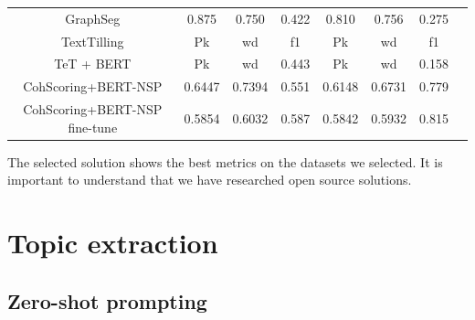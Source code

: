 \documentclass[PMI,VKR]{HSEUniversity}
\begin{document}
\begin{center}
\begin{tabular}{ | c | c | c | c | c | c | c | c |}
        GraphSeg & 0.875 & 0.750 & 0.422 & 0.810 & 0.756 & 0.275 \\
        TextTilling & Pk & wd & f1 & Pk & wd & f1 \\
        TeT + BERT & Pk & wd & 0.443 & Pk & wd & 0.158 \\ 
        \hline
        CohScoring+BERT-NSP & \cellcolor{green!20} 0.6447 & \cellcolor{green!20} 0.7394 & \cellcolor{green!20} 0.551 & \cellcolor{green!20} 0.6148 & \cellcolor{green!20} 0.6731 & \cellcolor{green!20} 0.779 \\ 
        CohScoring+BERT-NSP fine-tune & \cellcolor{green!40} 0.5854 & \cellcolor{green!40} 0.6032 & \cellcolor{green!40} 0.587 & \cellcolor{green!40} 0.5842 & \cellcolor{green!40} 0.5932 & \cellcolor{green!40} 0.815 \\ 
        \hline
    \end{tabular}
\end{center}

The selected solution shows the best metrics on the datasets we selected. 
It is important to understand that we have researched open source solutions.


\section{Topic extraction}

\subsection{Zero-shot prompting}
\end{document}
